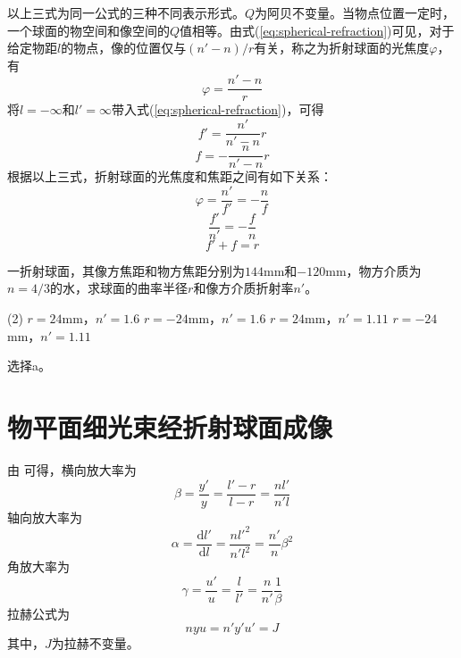 \documentclass[cn,10pt,chinesefont=founder,math=newtx,cite=super,twoside]{elegantbook}
\begin{document}
以上三式为同一公式的三种不同表示形式。$Q$为阿贝不变量。当物点位置一定时，一个球面的物空间和像空间的$Q$值相等。由式(\ref{eq:spherical-refraction})可见，对于给定物距$l$的物点，像的位置仅与$(n'-n)/r$有关，称之为折射球面的光焦度$\varphi$，有
\begin{equation}
\varphi=\frac{n'-n}{r}
\end{equation}
将$l=-\infty$和$l'=\infty$带入式(\ref{eq:spherical-refraction})，可得
\begin{equation}
f'=\frac{n'}{n'-n}r
\end{equation}
\begin{equation}
f=-\frac{n}{n'-n}r
\end{equation}
根据以上三式，折射球面的光焦度和焦距之间有如下关系：
\begin{equation}
\varphi=\frac{n'}{f'}=-\frac{n}{f}
\end{equation}
\begin{equation}
\frac{f'}{n'}=-\frac{f}{n}
\end{equation}
\begin{equation}
f'+f=r
\end{equation}

\begin{problem}
	一折射球面，其像方焦距和物方焦距分别为$144$mm和$-120$mm，物方介质为$n=4/3$的水，求球面的曲率半径$r$和像方介质折射率$n'$。
	\begin{tasks}(2)
		\task $r=24$mm，$n'=1.6$
		\task $r=-24$mm，$n'=1.6$
		\task $r=24$mm，$n'=1.11$
		\task $r=-24$mm，$n'=1.11$
	\end{tasks}
\end{problem}
\begin{solution}
	选择a。
\end{solution}

\section{物平面细光束经折射球面成像}
\label{sect:three-magnification}
由 可得，横向放大率为
\begin{equation}
\beta=\frac{y'}{y}=\frac{l'-r}{l-r}=\frac{nl'}{n'l}
\end{equation}
轴向放大率为
\begin{equation}
\alpha=\frac{\mathrm{d}l'}{\mathrm{d}l}=\frac{nl'^2}{n'l^2}=\frac{n'}{n}\beta^2
\end{equation}
角放大率为
\begin{equation}
\gamma=\frac{u'}{u}=\frac{l}{l'}=\frac{n}{n'}\frac{1}{\beta}
\end{equation}
拉赫公式为
\begin{equation}
nyu=n'y'u'=J
\end{equation}
其中，$J$为拉赫不变量。
\end{document}
